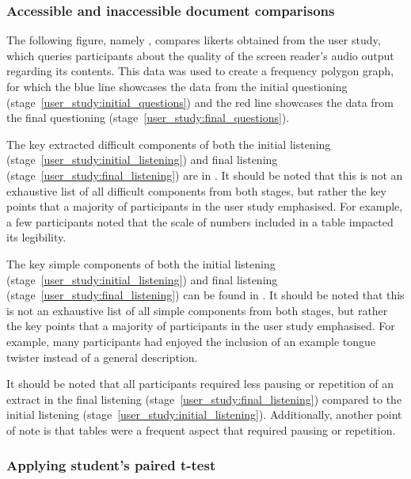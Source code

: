 \subsubsection{Accessible and inaccessible document comparisons}\label{user_study:accessibility_comparisons}

The following figure, namely , compares \glspl{likert} obtained from the user study, which queries participants about the quality of the screen reader's audio output regarding its contents. This data was used to create a frequency polygon graph, for which the blue line showcases the data from the initial questioning (stage~\ref{user_study:initial_questions}) and the red line showcases the data from the final questioning (stage~\ref{user_study:final_questions}).



The key extracted difficult components of both the initial listening (stage~\ref{user_study:initial_listening}) and final listening (stage~\ref{user_study:final_listening}) are in . It should be noted that this is not an exhaustive list of all difficult components from both stages, but rather the key points that a majority of participants in the user study emphasised. For example, a few participants noted that the scale of numbers included in a table impacted its legibility.



The key simple components of both the initial listening (stage~\ref{user_study:initial_listening}) and final listening (stage~\ref{user_study:final_listening}) can be found in . It should be noted that this is not an exhaustive list of all simple components from both stages, but rather the key points that a majority of participants in the user study emphasised. For example, many participants had enjoyed the inclusion of an example tongue twister instead of a general description.



It should be noted that all participants required less pausing or repetition of an extract in the final listening (stage~\ref{user_study:final_listening}) compared to the initial listening (stage~\ref{user_study:initial_listening}). Additionally, another point of note is that tables were a frequent aspect that required pausing or repetition.

\subsubsection{\nmu Applying \nmu student's paired t-test}\label{user_study:apply_paired_t-test}


